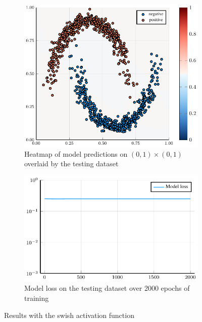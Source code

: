 \begin{figure}
	\centering
	\begin{subfigure}{0.49\textwidth}
		\centering
		\includegraphics[width=\textwidth]{images/swish-heatmap/swish.pdf}
		\caption{Heatmap of model predictions on \( \left( 0, 1 \right) \times \left( 0, 1 \right) \) overlaid by the testing dataset}
	\end{subfigure}
	\begin{subfigure}{0.49\textwidth}
		\centering
		\includegraphics[width=\textwidth]{images/swish-modelloss/swish.pdf}
		\caption{Model loss on the testing dataset over 2000 epochs of training}
	\end{subfigure}
	\caption{Results with the swish activation function}\label{swish}
\end{figure}


